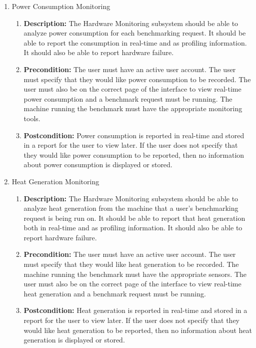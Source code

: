 \documentclass{article}
\begin{document}
\begin{enumerate}
\begin{enumerate}
		\item Power Consumption Monitoring
		\begin{enumerate}
			\item \textbf{Description:} The Hardware Monitoring subsystem should be able to analyze power consumption for each benchmarking request. It should be able to report the consumption in real-time and as profiling information. It should also be able to report hardware failure.
			\item \textbf{Precondition:} The user must have an active user account. The user must specify that they would like power consumption to be recorded. The user must also be on the correct page of the interface to view real-time power consumption and a benchmark request must be running. The machine running the benchmark must have the appropriate monitoring tools.
			\item \textbf{Postcondition:} Power consumption is reported in real-time and stored in a report for the user to view later. If the user does not specify that they would like power consumption to be reported, then no information about power consumption is displayed or stored.\newline
		\end{enumerate}
        
        \item Heat Generation Monitoring
		\begin{enumerate} 
			\item \textbf{Description:} The Hardware Monitoring subsystem should be able to analyze heat generation from the machine that a user's benchmarking request is being run on. It should be able to report that heat generation both in real-time and as profiling information. It should also be able to report hardware failure.
			\item \textbf{Precondition:} The user must have an active user account. The user must specify that they would like heat generation to be recorded. The machine running the benchmark must have the appropriate sensors. The user must also be on the correct page of the interface to view real-time heat generation and a benchmark request must be running. 
			\item \textbf{Postcondition:} Heat generation is reported in real-time and stored in a report for the user to view later. If the user does not specify that they would like heat generation to be reported, then no information about heat generation is displayed or stored.\newline
		\end{enumerate}
        

\end{enumerate}
\end{enumerate}
\end{document}
